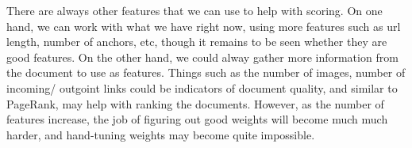\documentclass[10pt,twocolumn]{article}
\begin{document}
There are always other features that we can use to help with scoring. On one hand, we can work with what we have right now, using more features such as url length, number of anchors, etc, though it remains to be seen whether they are good features.
On the other hand, we could alway gather more information from the document to use as features. Things such as the number of images, number of incoming/ outgoint links could be indicators of document quality, and similar to PageRank, may help with ranking the documents. However, as the number of features increase, the job of figuring out good weights will become much much harder, and hand-tuning weights may become quite impossible.
\end{document}
